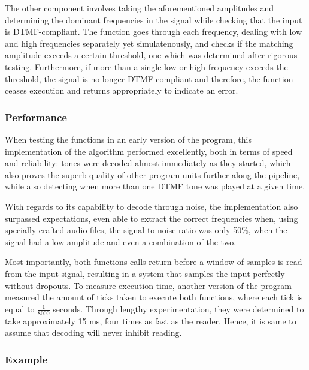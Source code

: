 \documentclass{cce2014-design}
\begin{document}
{		The other component involves taking the aforementioned amplitudes and determining the dominant frequencies in the signal while checking that the input is DTMF-compliant.
		The function goes through each frequency, dealing with low and high frequencies separately yet simulatenously, and checks if the matching amplitude exceeds a certain threshold, one which was determined after rigorous testing.
		Furthermore, if more than a single low or high frequency exceeds the threshold, the signal is no longer DTMF compliant and therefore, the function ceases execution and returns appropriately to indicate an error.

	\subsubsection{Performance}

		When testing the functions in an early version of the program, this implementation of the algorithm performed excellently, both in terms of speed and reliability: tones were decoded almost immediately as they started, which also proves the superb quality of other program units further along the pipeline, while also detecting when more than one DTMF tone was played at a given time.

		With regards to its capability to decode through noise, the implementation also surpassed expectations, even able to extract the correct frequencies when, using specially crafted audio files, the signal-to-noise ratio was only 50\%, when the signal had a low amplitude and even a combination of the two.

		Most importantly, both functions calls return before a window of samples is read from the input signal, resulting in a system that samples the input perfectly without dropouts.
		To measure execution time, another version of the program measured the amount of ticks taken to execute both functions, where each tick is equal to $\frac{1}{8000}$ seconds.
		Through lengthy experimentation, they were determined to take approximately 15 ms, four times as fast as the reader.
		Hence, it is same to assume that decoding will never inhibit reading.

	\subsubsection{Example}

}
\end{document}
